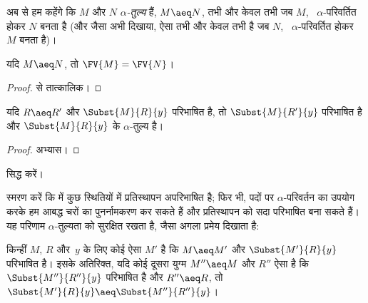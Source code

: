 \documentclass[../../../include/open-logic-section]{subfiles}
\begin{document}
अब से हम कहेंगे कि $M$ और $N$ \emph{$\alpha$-तुल्य} हैं, $M \aeq N$, तभी
और केवल तभी जब $M$, ~$\alpha$-परिवर्तित होकर $N$ बनता है (और जैसा अभी
दिखाया, ऐसा तभी और केवल तभी है जब $N$, ~$\alpha$-परिवर्तित होकर~$M$ बनता
है)।

\begin{thm}
  यदि $M \aeq N$, तो $\FV{M} = \FV{N}$।
\end{thm}

\begin{proof}
   से तात्कालिक।
\end{proof}

\begin{lem}
  यदि $R \aeq R'$ और $\Subst{M}{R}{y}$ परिभाषित है, तो
  $\Subst{M}{R'}{y}$ परिभाषित है और $\Subst{M}{R}{y}$ के $\alpha$-तुल्य
  है।
\end{lem}

\begin{proof}
  अभ्यास।
\end{proof}

\begin{prob}
   सिद्ध करें।
\end{prob}

स्मरण करें कि  में कुछ स्थितियों में प्रतिस्थापन अपरिभाषित
है; फिर भी, पदों पर $\alpha$-परिवर्तन का उपयोग करके हम आबद्ध चरों का
पुनर्नामकरण कर सकते हैं और प्रतिस्थापन को सदा परिभाषित बना सकते हैं। यह
परिणाम $\alpha$-तुल्यता को सुरक्षित रखता है, जैसा अगला प्रमेय दिखाता है:

\begin{thm}
  किन्हीं $M$, $R$ और~$y$ के लिए कोई ऐसा $M'$ है कि $M \aeq M'$ और
  $\Subst{M'}{R}{y}$ परिभाषित है। इसके अतिरिक्त, यदि कोई दूसरा युग्म
  $M'' \aeq M$ और $R''$ ऐसा है कि $\Subst{M''}{R''}{y}$ परिभाषित है और
  $R'' \aeq R$, तो $\Subst{M'}{R}{y} \aeq \Subst{M''}{R''}{y}$।
\end{thm}
\end{document}

